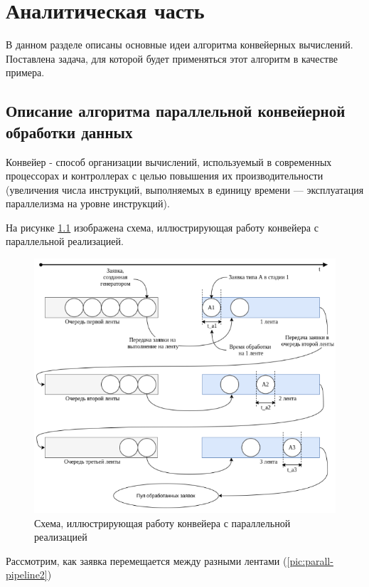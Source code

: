 \chapter{Аналитическая часть}

В данном разделе описаны основные идеи алгоритма конвейерных
вычислений. Поставлена задача, для которой будет применяться этот
алгоритм в качестве примера\cite{example}.


\section{Описание алгоритма параллельной конвейерной об­работки данных}



Конвейер - способ организации вычислений, используемый в со­временных
 процессорах и контроллерах с целью повышения их произ­водительности
  (увеличения числа инструкций, выполняемых в единицу
времени — эксплуатация параллелизма на уровне инструкций).


На рисунке \ref{pic:parall-pipeline1} изображена схема, 
иллюстрирующая работу кон­вейера с параллельной реализацией.

\begin{figure}[!htb]
	\centering
	\includegraphics[scale=0.5]{imgs/1}
	\caption{Схема, иллюстрирующая работу конвейера с
	параллельной реализацией}
	\label{pic:parall-pipeline1}
\end{figure}


Рассмотрим, как заявка перемещается между разными лентами (\ref{pic:parall-pipeline2})

